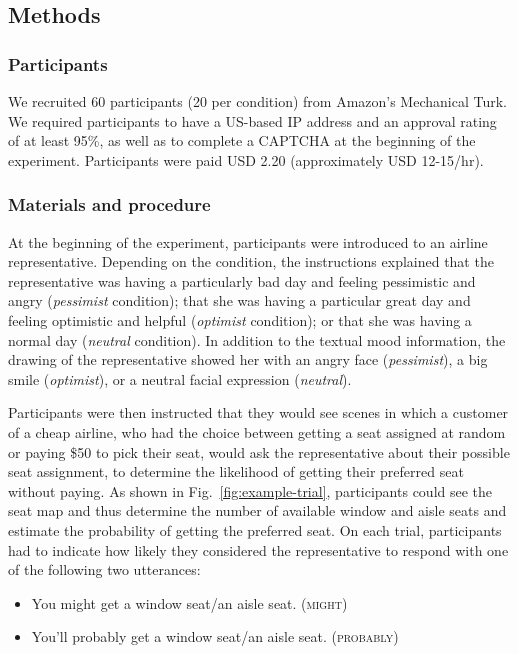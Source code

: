 \documentclass[man,floatsintext]{apa6}
\newcommand{\jd}[1]{\textcolor{Purple}{\bf [jd: #1]}}
\begin{document}
\subsection{Methods}

\subsubsection{Participants} We recruited 60 participants (20 per condition) from Amazon's Mechanical Turk. We required participants to have a US-based IP address and an approval rating of at least 95\%, as well as to complete a CAPTCHA at the beginning of the experiment. Participants were paid USD 2.20 (approximately USD 12-15/hr).

\subsubsection{Materials and procedure}
At the beginning of the experiment, participants were introduced to an airline representative. Depending on the condition, the instructions explained that the representative was having a particularly bad day and feeling pessimistic and angry (\textit{pessimist} condition); that she was having a particular great day and feeling optimistic and helpful (\textit{optimist} condition); or that she was having a normal day (\textit{neutral} condition). In addition to the textual mood information, the drawing of the representative  showed her with an angry face (\textit{pessimist}), a big smile (\textit{optimist}), or a neutral facial expression (\textit{neutral}).

Participants were then instructed that they would see scenes in which a customer of a cheap airline, who had the choice between getting a seat assigned at random or paying \$50 to pick their seat, would ask the representative about their possible seat assignment, to determine the likelihood of getting their preferred seat without paying. As shown in Fig.~\ref{fig:example-trial}, participants could see the seat map and thus determine the number of available window and aisle seats and estimate the probability of getting the preferred seat. On each trial, participants had to indicate how likely they considered the representative to respond with one of the following two  utterances:

\begin{itemize}
    \item You might get a window seat/an aisle seat. (\textsc{might})
    \item You'll probably get a window seat/an aisle seat. (\textsc{probably})
\end{itemize}
\end{document}
